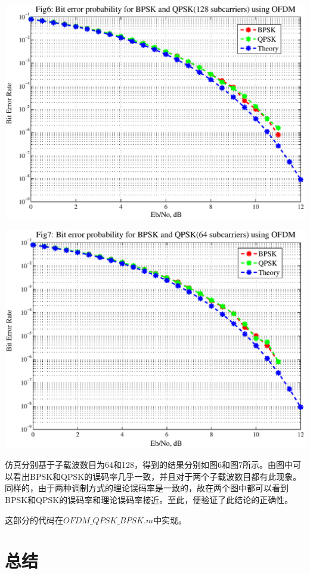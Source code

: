 \documentclass[a4paper,11pt,onecolumn,twoside]{article}
\begin{document}
\begin{center}
    \includegraphics[width=1\textwidth]{fig6.eps}
\end{center}
\begin{center}
    \includegraphics[width=1\textwidth]{fig7.eps}
\end{center}

仿真分别基于子载波数目为64和128，得到的结果分别如图6和图7所示。由图中可以看出BPSK和QPSK的误码率几乎一致，并且对于两个子载波数目都有此现象。同样的，由于两种调制方式的理论误码率是一致的，故在两个图中都可以看到BPSK和QPSK的误码率和理论误码率接近。至此，便验证了此结论的正确性。

这部分的代码在$OFDM\_QPSK\_BPSK.m$中实现。

\section{总结}
\end{document}
